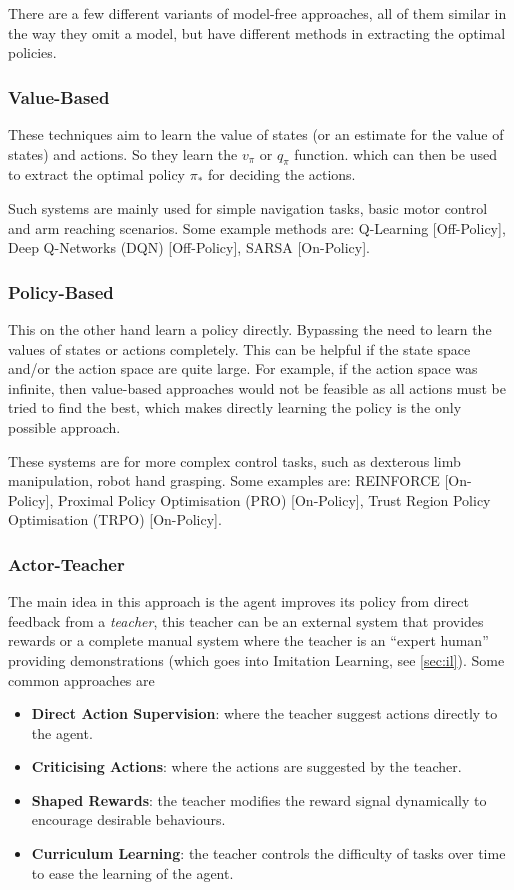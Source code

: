   There are a few different variants of model-free approaches, all of them similar in the way they omit a model, but have different methods in extracting the optimal policies.
  

  \subsubsection{Value-Based}
    These techniques aim to learn the value of states (or an estimate for the value of states) and actions. So they learn the $v_\pi$ or $q_\pi$ function. which can then be used to extract the optimal policy $\pi_*$ for deciding the actions.

    Such systems are mainly used for simple navigation tasks, basic motor control and arm reaching scenarios. Some example methods are: Q-Learning [Off-Policy], Deep Q-Networks (DQN) [Off-Policy], SARSA [On-Policy]. 

  \subsubsection{Policy-Based}
  This on the other hand learn a policy directly. Bypassing the need to learn the values of states or actions completely. This can be helpful if the state space and/or the action space are quite large. For example, if the action space was infinite, then value-based approaches would not be feasible as all actions must be tried to find the best, which makes directly learning the policy is the only possible approach.

  These systems are for more complex control tasks, such as dexterous limb manipulation, robot hand grasping. Some examples are: REINFORCE [On-Policy], Proximal Policy Optimisation (PRO) [On-Policy], Trust Region Policy Optimisation (TRPO) [On-Policy]. 

  \subsubsection{Actor-Teacher} 
  The main idea in this approach is the agent improves its policy from direct feedback from a \emph{teacher}, this teacher can be an external system that provides rewards or a complete manual system where the teacher is an ``expert human'' providing demonstrations (which goes into Imitation Learning, see \ref{sec:il}). Some common approaches are
  \begin{itemize}
    \item \textbf{Direct Action Supervision}: where the teacher suggest actions directly to the agent.
    \item \textbf{Criticising Actions}: where the actions are suggested by the teacher.
    \item \textbf{Shaped Rewards}: the teacher modifies the reward signal dynamically to encourage desirable behaviours.
    \item \textbf{Curriculum Learning}: the teacher controls the difficulty of tasks over time to ease the learning of the agent.
  \end{itemize}
  
